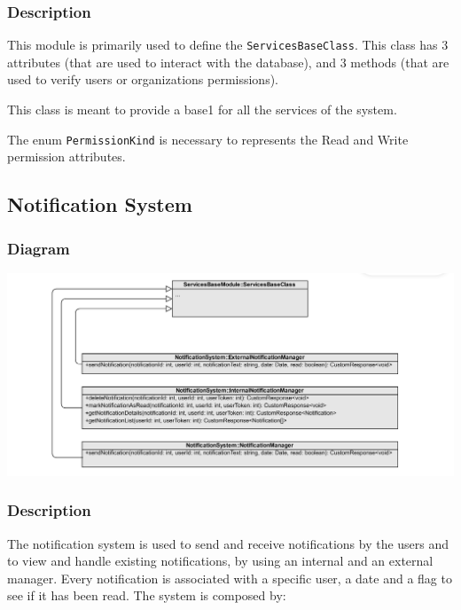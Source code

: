 \documentclass{article}
\begin{document}
\subsubsection{Description}

This module is primarily used to define the  \texttt{ServicesBaseClass}.
This class has 3 attributes (that are used to interact with the database), and
3 methods (that are used to verify users or organizations permissions).

This class is meant to provide a base1 for all the services of the system.

The enum \texttt{PermissionKind} is necessary to represents the Read and Write permission attributes.


\subsection{Notification System}
\subsubsection{Diagram}

\includegraphics[width=\textwidth,height=\textheight,keepaspectratio]{images/class_diagram/notificationSystem.jpg}

\subsubsection{Description}

The notification system is used to send and receive notifications by the users and to view and handle existing notifications, by using an internal and an external manager. Every notification is associated with a specific user, a date and a flag to see if it has been read. The system is composed by:
\end{document}
